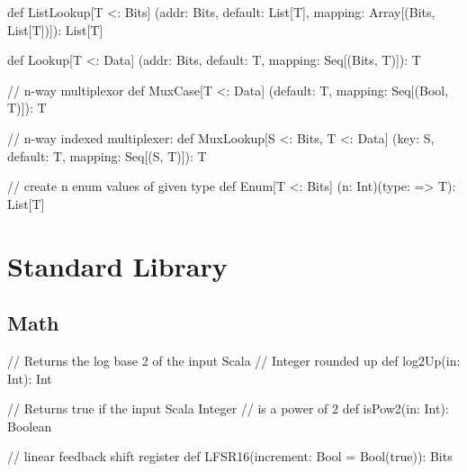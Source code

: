 \documentclass[10pt,twocolumn]{article}
\begin{document}
\lstset{language=scala}

\begin{scala}
def ListLookup[T <: Bits]
  (addr: Bits, default: List[T], 
   mapping: Array[(Bits, List[T])]): List[T]

def Lookup[T <: Data]
  (addr: Bits, default: T, 
   mapping: Seq[(Bits, T)]): T

// n-way multiplexor
def MuxCase[T <: Data] 
  (default: T, mapping: Seq[(Bool, T)]): T

// n-way indexed multiplexer:
def MuxLookup[S <: Bits, T <: Data] 
  (key: S, default: T, mapping: Seq[(S, T)]): T
\end{scala}


\begin{scala}
// create n enum values of given type
def Enum[T <: Bits]
  (n: Int)(type: => T): List[T]
\end{scala}

% 

\section{Standard Library}

\subsection{Math}

\begin{scala}
// Returns the log base 2 of the input Scala 
// Integer rounded up
def log2Up(in: Int): Int

// Returns true if the input Scala Integer 
// is a power of 2
def isPow2(in: Int): Boolean

// linear feedback shift register
def LFSR16(increment: Bool = Bool(true)): Bits
\end{scala}
\end{document}
